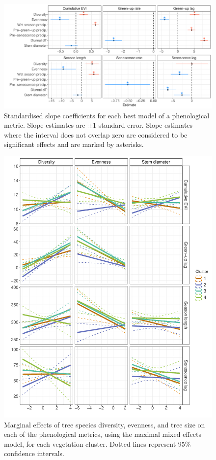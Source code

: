 \begin{refsection}
\begin{figure}
	\includegraphics[width=\linewidth]{img/mod_slopes}
	\caption[Model slope coefficients for each phenological metric]{Standardised slope coefficients for each best model of a phenological metric. Slope estimates are $\pm$1 standard error. Slope estimates where the interval does not overlap zero are considered to be significant effects and are marked by asterisks.}
	\label{phen:mod_slopes}
\end{figure}

\begin{figure}
	\includegraphics[width=\linewidth]{img/mod_marg}
	\caption[Marginal effects of species diversity on each phenological metric per vegetation type]{Marginal effects of tree species diversity, evenness, and tree size on each of the phenological metrics, using the maximal mixed effects model, for each vegetation cluster. Dotted lines represent 95\% confidence intervals.}
	\label{phen:mod_marg}
\end{figure}


\end{refsection}
